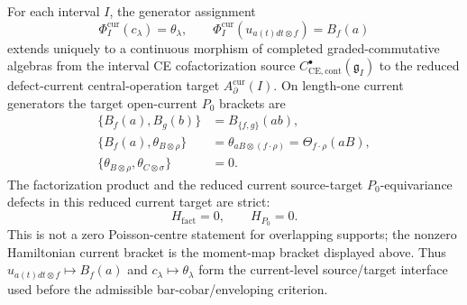 \begin{thm}
\label{thm:app-factorization-universal-current-interface}
  For each interval \(I\), the generator assignment
  \[
    \Phi_I^{\mathrm{cur}}(c_\lambda)=\theta_\lambda,\qquad
    \Phi_I^{\mathrm{cur}}(u_{a(t)dt\otimes f})=B_f(a)
  \]
  extends uniquely to a continuous morphism of completed
  graded-commutative algebras from the interval CE cofactorization source
  \(C^\bullet_{\mathrm{CE},\mathrm{cont}}(\mathfrak g_I)\) to the
  reduced defect-current central-operation target
  \(A_\partial^{\mathrm{cur}}(I)\).  On length-one current generators
  the target open-current \(P_0\) brackets are
  \[
  \begin{aligned}
    \{B_f(a),B_g(b)\}
      &=B_{\{f,g\}}(ab),\\
    \{B_f(a),\theta_{B\otimes\rho}\}
      &=\theta_{aB\otimes(f\cdot\rho)}
        =\Theta_{f\cdot\rho}(aB),\\
    \{\theta_{B\otimes\rho},\theta_{C\otimes\sigma}\}
      &=0 .
  \end{aligned}
  \]
  The factorization product and the reduced current source-target
  \(P_0\)-equivariance defects in this reduced current target are strict:
  \[
    H_{\mathrm{fact}}=0,\qquad H_{P_0}=0.
  \]
  This is not a zero Poisson-centre statement for overlapping supports;
  the nonzero Hamiltonian current bracket is the moment-map bracket
  displayed above.  Thus \(u_{a(t)dt\otimes f}\mapsto B_f(a)\) and
  \(c_\lambda\mapsto\theta_\lambda\) form the current-level
  source/target interface used before the admissible bar-cobar/enveloping
  criterion.
\end{thm}

